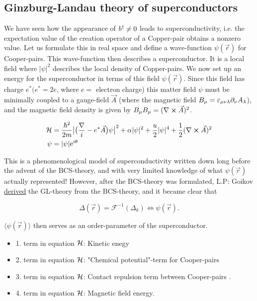 \subsection[Ginzburg-Landau]{Ginzburg-Landau theory of superconductors}

We have seen how the appearance of $b^{\dagger} \neq 0$ leads to superconductivity, i.e. the expectation value of the creation operator of a Copper-pair obtains a nonzero value. Let us formulate this in real space and define a wave-function $\psi(\vec{r}) $ for Cooper-pairs. This wave-function then describes a superconductor. It is a local field where $|\psi|^2$ describes the local density of Copper-pairs. We now set up an energy for the superconductor in terms of this field $\psi(\vec{r})$. Since this field has charge $e^* (e^* = 2e$, where $e =$ electron charge) this matter field $\psi$ must be minimally coupled to a gauge-field $\vec{A}$ (where the magnetic field $B_\mu = \varepsilon_{\mu\nu\lambda} \partial_\nu A_\lambda$), and the magnetic field density is given by $B_\mu B_\mu = (\nabla \cross \vec{A} )^2$.


\begin{equation}
\begin{aligned}
\mathcal{H}  &= \frac{\hbar^2}{2m} \big|\big(\frac{\nabla}{i} - e^*\vec{A}\big)\psi \big|^2 + \alpha |\psi|^2 + \frac{u}{2} |\psi|^4 + \frac{1}{2}(\nabla \cross \vec{A} )^2 \\
\psi &= |\psi| \mathrm{e}^{i\theta}
\label{Ham_ginz_lan}
\end{aligned}
\end{equation}

This is a phenomenological model of superconductivity written down long before the advent of the BCS-theory, and with very limited knowledge of what $\psi(\vec{r})$ actually represented! However, after the BCS-theory was formulated, L.P: Goikov \underline{derived} the GL-theory from the BCS-theory, and it became clear that

\begin{equation}
\Delta (\vec{r}) = \mathcal{F}^{-1}(\Delta_k) \iff \psi(\vec{r}).
\label{gap_fourrier}
\end{equation}

$\langle \psi(\vec{r}) \rangle$ then serves as an order-parameter of the superconductor.

\begin{itemize}
\item 1. term in equation $\mathcal{H}$: Kinetic enegy
\item 2. term in equation $\mathcal{H}$: "Chemical potential"-term for Cooper-pairs
\item 3. term in equation $\mathcal{H}$: Contact repulsion term between Cooper-pairs .
\item 4. term in equation $\mathcal{H}$: Magnetic field energy.
\end{itemize}

